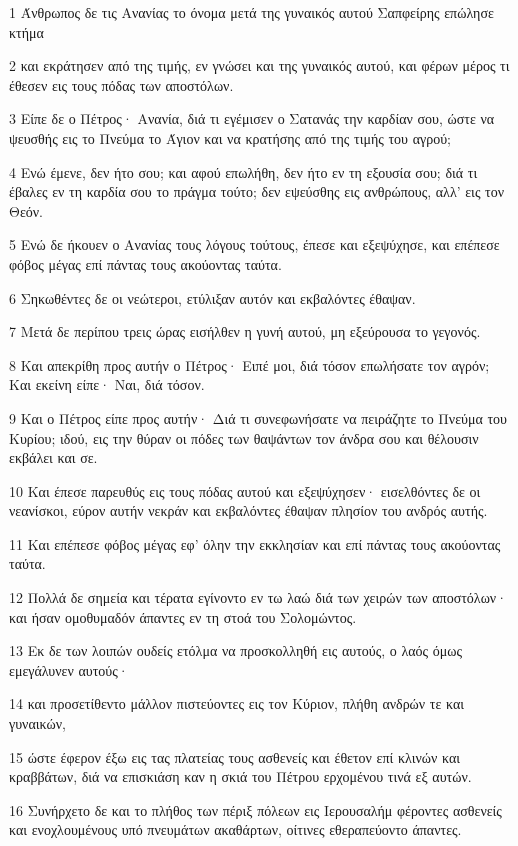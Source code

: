\par 1 Άνθρωπος δε τις Ανανίας το όνομα μετά της γυναικός αυτού Σαπφείρης επώλησε κτήμα
\par 2 και εκράτησεν από της τιμής, εν γνώσει και της γυναικός αυτού, και φέρων μέρος τι έθεσεν εις τους πόδας των αποστόλων.
\par 3 Είπε δε ο Πέτρος· Ανανία, διά τι εγέμισεν ο Σατανάς την καρδίαν σου, ώστε να ψευσθής εις το Πνεύμα το Άγιον και να κρατήσης από της τιμής του αγρού;
\par 4 Ενώ έμενε, δεν ήτο σου; και αφού επωλήθη, δεν ήτο εν τη εξουσία σου; διά τι έβαλες εν τη καρδία σου το πράγμα τούτο; δεν εψεύσθης εις ανθρώπους, αλλ' εις τον Θεόν.
\par 5 Ενώ δε ήκουεν ο Ανανίας τους λόγους τούτους, έπεσε και εξεψύχησε, και επέπεσε φόβος μέγας επί πάντας τους ακούοντας ταύτα.
\par 6 Σηκωθέντες δε οι νεώτεροι, ετύλιξαν αυτόν και εκβαλόντες έθαψαν.
\par 7 Μετά δε περίπου τρεις ώρας εισήλθεν η γυνή αυτού, μη εξεύρουσα το γεγονός.
\par 8 Και απεκρίθη προς αυτήν ο Πέτρος· Ειπέ μοι, διά τόσον επωλήσατε τον αγρόν; Και εκείνη είπε· Ναι, διά τόσον.
\par 9 Και ο Πέτρος είπε προς αυτήν· Διά τι συνεφωνήσατε να πειράζητε το Πνεύμα του Κυρίου; ιδού, εις την θύραν οι πόδες των θαψάντων τον άνδρα σου και θέλουσιν εκβάλει και σε.
\par 10 Και έπεσε παρευθύς εις τους πόδας αυτού και εξεψύχησεν· εισελθόντες δε οι νεανίσκοι, εύρον αυτήν νεκράν και εκβαλόντες έθαψαν πλησίον του ανδρός αυτής.
\par 11 Και επέπεσε φόβος μέγας εφ' όλην την εκκλησίαν και επί πάντας τους ακούοντας ταύτα.
\par 12 Πολλά δε σημεία και τέρατα εγίνοντο εν τω λαώ διά των χειρών των αποστόλων· και ήσαν ομοθυμαδόν άπαντες εν τη στοά του Σολομώντος.
\par 13 Εκ δε των λοιπών ουδείς ετόλμα να προσκολληθή εις αυτούς, ο λαός όμως εμεγάλυνεν αυτούς·
\par 14 και προσετίθεντο μάλλον πιστεύοντες εις τον Κύριον, πλήθη ανδρών τε και γυναικών,
\par 15 ώστε έφερον έξω εις τας πλατείας τους ασθενείς και έθετον επί κλινών και κραββάτων, διά να επισκιάση καν η σκιά του Πέτρου ερχομένου τινά εξ αυτών.
\par 16 Συνήρχετο δε και το πλήθος των πέριξ πόλεων εις Ιερουσαλήμ φέροντες ασθενείς και ενοχλουμένους υπό πνευμάτων ακαθάρτων, οίτινες εθεραπεύοντο άπαντες.
